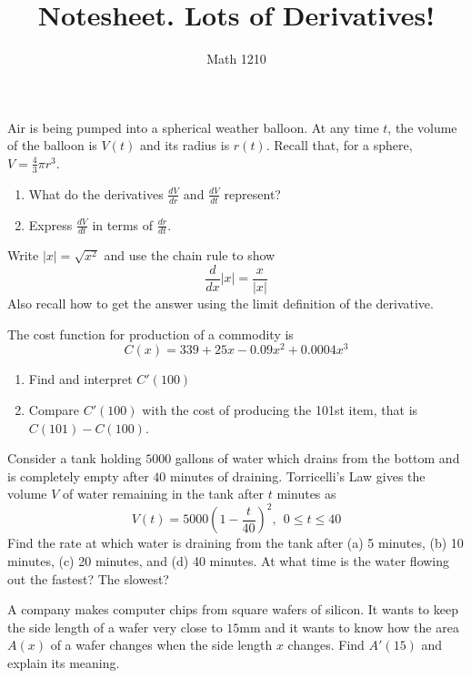 \documentclass[12pt, a4paper]{article}
\author{Math 1210}
\title{Notesheet. Lots of Derivatives!}
\date{}
\begin{document}
\maketitle
\nameline
\begin{ex}
  Air is being pumped into a spherical weather balloon. At any time
  \(t\), the volume of the balloon is \(V(t)\) and its radius is
  \(r(t)\). Recall that, for a sphere, \(V = \frac{4}{3} \pi r^3\).
  \begin{enumerate}
  \item What do the derivatives \(\frac{dV}{dr}\) and
    \(\frac{dV}{dt}\) represent?
  \item Express \(\frac{dV}{dt}\) in terms of \(\frac{dr}{dt}\).
  \end{enumerate}
\end{ex}
\begin{ex}
  Write \(|x| = \sqrt{x^2}\) and use the chain rule to show \[
    \frac{d}{dx}|x| = \frac{x}{|x|}
  \]
  Also recall how to get the answer using the limit definition of the
  derivative.
\end{ex}
\begin{ex}
  The cost function for production of a commodity is \[
    C(x) = 339 + 25x - 0.09x^2 + 0.0004 x^3
  \]
  \begin{enumerate}
  \item Find and interpret \(C'(100)\)
  \item Compare \(C'(100)\) with the cost of producing the 101st item,
    that is \(C(101) - C(100)\).
  \end{enumerate}
\end{ex}
\begin{ex}
  Consider a tank holding \(5000\) gallons of water which drains from
  the bottom and is completely empty after \(40\) minutes of
  draining. Torricelli's Law gives the volume \(V\) of water remaining
  in the tank after \(t\) minutes as \[
    V(t) = 5000\left( 1 - \frac{t}{40} \right)^2, \ \ 0 \leq t \leq 40
  \]
  Find the rate at which water is draining from the tank after (a) 5
  minutes, (b) 10 minutes, (c) 20 minutes, and (d) 40 minutes. At what
  time is the water flowing out the fastest? The slowest?
\end{ex}
\begin{ex}
  A company makes computer chips from square wafers of silicon. It
  wants to keep the side length of a wafer very close to \(15\)mm and
  it wants to know how the area \(A(x)\) of a wafer changes when the
  side length \(x\) changes. Find \(A'(15)\) and explain its meaning.
\end{ex}
\end{document}

